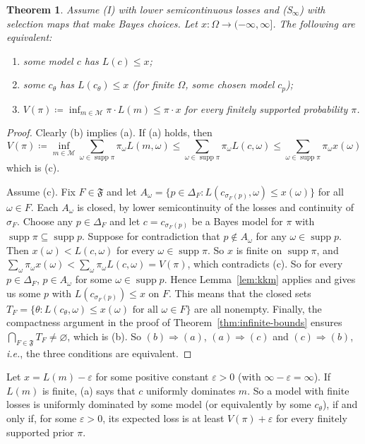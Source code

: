 \documentclass[11pt]{article}
\newtheorem{theorem}{Theorem}[section]
\theoremstyle{definition}
\theoremstyle{remark}
\newcommand{\M}{\mathcal M}
\newcommand{\F}{\mathfrak F}
\newcommand{\supp}{\operatorname{supp}}
\begin{document}
\begin{theorem}\label{thm:margin}
Assume (I) with lower semicontinuous losses and (S$_\infty$) with selection maps that make Bayes choices. Let $x:\Omega\to(-\infty,\infty]$. The following are equivalent:
\begin{enumerate}[label=(\alph*)]
\item some model $c$ has $L(c)\le x$;
\item some $c_\theta$ has $L(c_\theta)\le x$ (for finite $\Omega$, some chosen model $c_p$);
\item $V(\pi)\coloneqq \inf_{m\in\M}\pi\cdot L(m)\le\pi\cdot x$ for every finitely supported probability $\pi$.
\end{enumerate}
\end{theorem}
\begin{proof}
Clearly (b) implies (a). If (a) holds, then
\[
V(\pi)\coloneqq \inf_{m\in\M}\sum_{\omega\in\supp\pi}\pi_\omega L(m,\omega)\le\sum_{\omega\in\supp\pi}\pi_\omega L(c,\omega)\le\sum_{\omega\in\supp\pi}\pi_\omega x(\omega)
\]
which is (c).

Assume (c). Fix $F\in\F$ and let $A_\omega=\{p\in\Delta_F:L(c_{\sigma_F(p)},\omega)\le x(\omega)\}$ for all $\omega\in F$. Each $A_\omega$ is closed, by lower semicontinuity of the losses and continuity of $\sigma_F$. Choose any $p\in\Delta_F$ and let $c=c_{\sigma_F(p)}$ be a Bayes model for $\pi$ with $\supp\pi\subseteq\supp p$. Suppose for contradiction that $p\not\in A_\omega$ for any $\omega\in\supp p$. Then $x(\omega)<L(c,\omega)$ for every $\omega\in\supp\pi$. So $x$ is finite on $\supp\pi$, and $\sum_\omega\pi_\omega x(\omega)<\sum_\omega\pi_\omega L(c,\omega)=V(\pi)$, which contradicts (c). So for every $p\in\Delta_F$, $p\in A_\omega$ for some $\omega\in\supp p$. Hence Lemma~\ref{lem:kkm} applies and gives us some $p$ with $L(c_{\sigma_F(p)})\le x$ on $F$. This means that the closed sets $T_F=\{\theta:L(c_\theta,\omega)\le x(\omega)\text{ for all }\omega\in F\}$ are all nonempty. Finally, the compactness argument in the proof of Theorem~\ref{thm:infinite-bounds} ensures $\bigcap_{F\in\F}T_F\neq \varnothing$, which is (b). So $(b)\Rightarrow (a)$, $(a)\Rightarrow (c)$ and $(c)\Rightarrow (b)$, \textit{i.e.}, the three conditions are equivalent.
\end{proof}




Let $x=L(m)-\varepsilon$ for some positive constant $\varepsilon>0$ (with $\infty-\varepsilon=\infty$). If $L(m)$ is finite, (a) says that $c$ uniformly dominates $m$. So a model with finite losses is uniformly dominated by some model (or equivalently by some $c_\theta$), if and only if, for some $\varepsilon>0$, its expected loss is at least $V(\pi)+\varepsilon$ for every finitely supported prior $\pi$.
\end{document}

